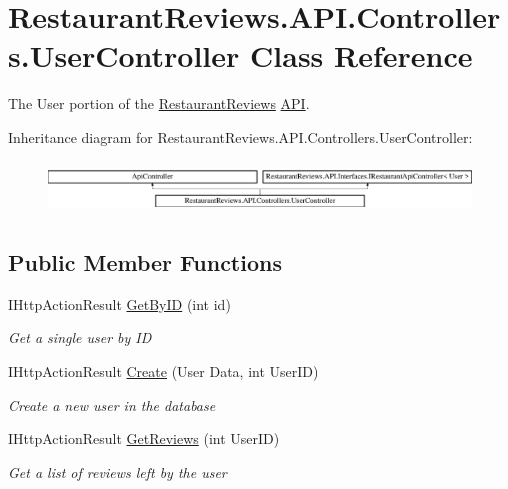\hypertarget{class_restaurant_reviews_1_1_a_p_i_1_1_controllers_1_1_user_controller}{}\section{Restaurant\+Reviews.\+A\+P\+I.\+Controllers.\+User\+Controller Class Reference}
\label{class_restaurant_reviews_1_1_a_p_i_1_1_controllers_1_1_user_controller}


The User portion of the \hyperlink{namespace_restaurant_reviews}{Restaurant\+Reviews} \hyperlink{namespace_restaurant_reviews_1_1_a_p_i}{A\+PI}.  


Inheritance diagram for Restaurant\+Reviews.\+A\+P\+I.\+Controllers.\+User\+Controller\+:\begin{figure}[H]
\begin{center}
\leavevmode
\includegraphics[height=1.389578cm]{class_restaurant_reviews_1_1_a_p_i_1_1_controllers_1_1_user_controller}
\end{center}
\end{figure}
\subsection*{Public Member Functions}
\begin{DoxyCompactItemize}
\item 
I\+Http\+Action\+Result \hyperlink{class_restaurant_reviews_1_1_a_p_i_1_1_controllers_1_1_user_controller_a988b325cac112a16b9feb623983e821c}{Get\+By\+ID} (int id)
\begin{DoxyCompactList}\small\item\em Get a single user by ID \end{DoxyCompactList}\item 
I\+Http\+Action\+Result \hyperlink{class_restaurant_reviews_1_1_a_p_i_1_1_controllers_1_1_user_controller_a5f2f012122d5783db2180d9a1adc6a1c}{Create} (User Data, int User\+ID)
\begin{DoxyCompactList}\small\item\em Create a new user in the database \end{DoxyCompactList}\item 
I\+Http\+Action\+Result \hyperlink{class_restaurant_reviews_1_1_a_p_i_1_1_controllers_1_1_user_controller_a53662e3765a154ee9d892c30eee1ba86}{Get\+Reviews} (int User\+ID)
\begin{DoxyCompactList}\small\item\em Get a list of reviews left by the user \end{DoxyCompactList}\end{DoxyCompactItemize}



